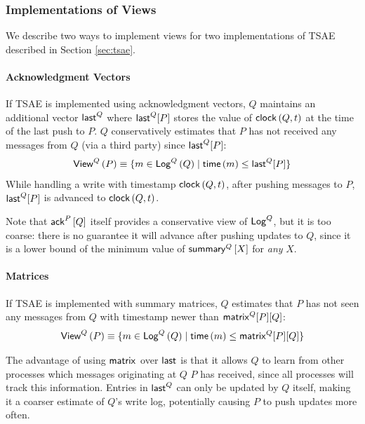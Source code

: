 \documentclass[]             %
{NASA}                       %
\theoremstyle{definition}
\begin{document}
\subsubsection{Implementations of Views}\label{sssec:conit-views}
We describe two ways to implement views for two implementations of
TSAE described in Section \ref{sec:tsae}.

\paragraph{Acknowledgment Vectors}
If TSAE is implemented using acknowledgment vectors, $Q$ maintains an
additional vector $\mathsf{last}^{Q}$ where $\mathsf{last}^{Q}[P]$ stores the value
of $\mathsf{clock}\left(Q,t\right)$ at the time of the last push to $P$. $Q$
conservatively estimates that $P$ has not received any messages from
$Q$ (via a third party) since $\mathsf{last}^{Q}[P]$:
\begin{equation}
  \mathsf{View}^{Q}\left(P\right) \equiv \{ m \in \mathsf{Log}^{Q}\left(Q\right) \mid \mathsf{time}\left(m\right) \leq
  \mathsf{last}^{Q}[P] \}
\end{equation}
While handling a write with timestamp $\mathsf{clock}\left(Q, t\right)$, after pushing
messages to $P$, $\mathsf{last}^{Q}[P]$ is advanced to $\mathsf{clock}\left(Q, t\right)$.

Note that $\mathsf{ack}^{P}\left[Q\right]$ itself provides a conservative view of
$\mathsf{Log}^{Q}$, but it is too coarse: there is no guarantee it will advance
after pushing updates to $Q$, since it is a lower bound of the minimum
value of $\mathsf{summary}^{Q}\left[X\right]$ for \emph{any} $X$.

\paragraph{Matrices}
If TSAE is implemented with summary matrices, $Q$ estimates that $P$
has not seen any messages from $Q$ with timestamp newer than
$\mathsf{matrix}^{Q}[P][Q]$:
\begin{equation}
  \mathsf{View}^{Q}\left(P\right) \equiv \{ m \in \mathsf{Log}^{Q}\left(Q\right) \mid \mathsf{time}\left(m\right) \leq
  \mathsf{matrix}^{Q}[P][Q] \}
\end{equation}

The advantage of using $\mathsf{matrix}^{}$ over $\mathsf{last}^{}$ is that it
allows $Q$ to learn from other processes which messages originating at
$Q$ $P$ has received, since all processes will track this
information. Entries in $\mathsf{last}^{Q}$ can only be updated by $Q$
itself, making it a coarser estimate of $Q$'s write log, potentially
causing $P$ to push updates more often.
\end{document}
